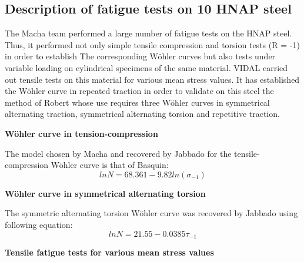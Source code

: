 \subsection{Description of fatigue tests on 10 HNAP steel}
The Macha team performed a large number of fatigue tests on the HNAP steel. Thus, it performed not only simple tensile compression and torsion tests (R = -1) in order to establish The corresponding Wöhler curves but also tests under variable loading on cylindrical specimens of the same material\cite{ACHTELIC1994}. VIDAL\cite{VIDAL1996} carried out tensile tests on this material for various mean stress values. It has established the Wöhler curve in repeated traction in order to validate on this steel the method of Robert whose use requires three Wöhler curves in symmetrical alternating traction, symmetrical alternating torsion and repetitive traction.

\vspace{6pt}
\noindent
\textbf{Wöhler curve in tension-compression}

The model chosen by Macha and recovered by Jabbado\cite{jabbado:pastel-00002116} for the tensile-compression Wöhler curve is that of Basquin:
\begin{equation}
lnN=68.361 − 9.82ln\left( \sigma_{-1}\right) 
\end{equation}

\noindent
\textbf{Wöhler curve in symmetrical alternating torsion}

The symmetric alternating torsion Wöhler curve was recovered by Jabbado\cite{jabbado:pastel-00002116} using following equation:
\begin{equation}
lnN=21.55 − 0.0385\tau_{-1}
\end{equation}

\noindent
\textbf{Tensile fatigue tests for various mean stress values}

